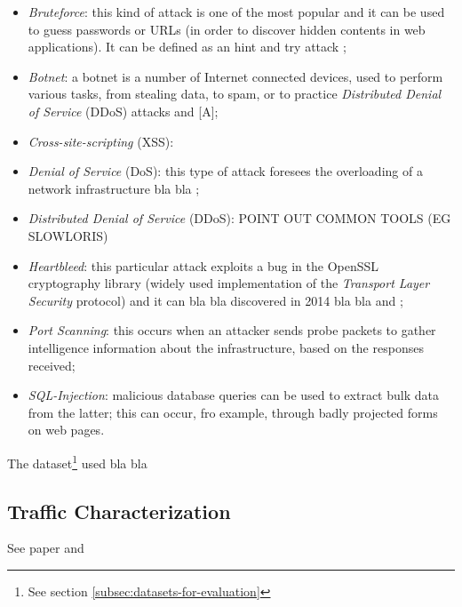 \begin{itemize}
    \item[\faCaretRight] \textit{Bruteforce}: this kind of attack is one of the most popular and it can be used to guess passwords or URLs (in order to discover hidden contents in web applications). It can be defined as an hint and try attack \cite{icissp18};
    \item[\faCaretRight] \textit{Botnet}: a botnet is a number of Internet connected devices, used to perform various tasks, from stealing data, to spam, or to practice \textit{Distributed Denial of Service} (DDoS) attacks \cite{icissp18} and [A];
    \item[\faCaretRight] \textit{Cross-site-scripting} (XSS):
    \item[\faCaretRight] \textit{Denial of Service} (DoS): this type of attack foresees the overloading of a network infrastructure bla bla \cite{Sharafaldin2019};
    \item[\faCaretRight] \textit{Distributed Denial of Service} (DDoS): POINT OUT COMMON TOOLS (EG SLOWLORIS)
    \item[\faCaretRight] \textit{Heartbleed}: this particular attack exploits a bug in the OpenSSL cryptography library (widely used implementation of the \textit{Transport Layer Security} protocol) and it can bla bla discovered in 2014 bla bla \cite{icissp18} and \cite{Carvalho2014};
    \item[\faCaretRight] \textit{Port Scanning}: this occurs when an attacker sends probe packets to gather intelligence information about the infrastructure, based on the responses received;
    \item[\faCaretRight] \textit{SQL-Injection}: malicious database queries can be used to extract bulk data from the latter; this can occur, fro example, through badly projected forms on web pages.
\end{itemize}

The dataset\footnote{See section \ref{subsec:datasets-for-evaluation}} used bla bla


\subsection{Traffic Characterization}
\label{subsec:traffic-characterization}

See paper \cite{Iglesias2015} and  \cite{Velan2016} \\

